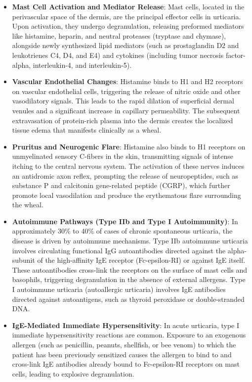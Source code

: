 \begin{itemize}
    \item \textbf{Mast Cell Activation and Mediator Release}: Mast cells, located in the perivascular space of the dermis, are the principal effector cells in urticaria. Upon activation, they undergo degranulation, releasing preformed mediators like histamine, heparin, and neutral proteases (tryptase and chymase), alongside newly synthesized lipid mediators (such as prostaglandin D2 and leukotrienes C4, D4, and E4) and cytokines (including tumor necrosis factor-alpha, interleukin-4, and interleukin-5).
    \item \textbf{Vascular Endothelial Changes}: Histamine binds to H1 and H2 receptors on vascular endothelial cells, triggering the release of nitric oxide and other vasodilatory signals. This leads to the rapid dilation of superficial dermal venules and a significant increase in capillary permeability. The subsequent extravasation of protein-rich plasma into the dermis creates the localized tissue edema that manifests clinically as a wheal.
    \item \textbf{Pruritus and Neurogenic Flare}: Histamine also binds to H1 receptors on unmyelinated sensory C-fibers in the skin, transmitting signals of intense itching to the central nervous system. The activation of these nerves induces an antidromic axon reflex, prompting the release of neuropeptides, such as substance P and calcitonin gene-related peptide (CGRP), which further promote local vasodilation and produce the erythematous flare surrounding the wheal.
    \item \textbf{Autoimmune Pathways (Type IIb and Type I Autoimmunity)}: In approximately 30\% to 40\% of cases of chronic spontaneous urticaria, the disease is driven by autoimmune mechanisms. Type IIb autoimmune urticaria involves circulating functional IgG autoantibodies directed against the alpha-subunit of the high-affinity IgE receptor (Fc-epsilon-RI) or against IgE itself. These autoantibodies cross-link the receptors on the surface of mast cells and basophils, triggering degranulation in the absence of external allergens. Type I autoimmune urticaria (autoallergic urticaria) involves IgE antibodies directed against autoantigens, such as thyroid peroxidase or double-stranded DNA.
    \item \textbf{IgE-Mediated Immediate Hypersensitivity}: In acute urticaria, type I immediate hypersensitivity reactions are common. Exposure to an exogenous allergen (such as penicillin, peanuts, shellfish, or bee venom) to which the patient has been previously sensitized causes the allergen to bind to and cross-link IgE antibodies already bound to Fc-epsilon-RI receptors on mast cells, leading to explosive degranulation.

\end{itemize}
